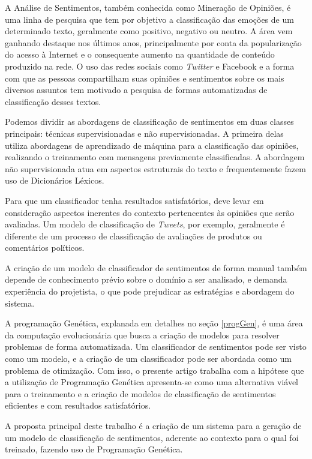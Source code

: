 \documentclass[12pt]{article}
\begin{document}
A Análise de Sentimentos, também conhecida como Mineração de Opiniões, é uma linha de pesquisa que tem por objetivo a classificação das emoções de um determinado texto, geralmente como positivo, negativo ou neutro. A área vem ganhando destaque nos últimos anos, principalmente por conta da popularização do acesso à Internet e o consequente aumento na quantidade de conteúdo produzido na rede. O uso das redes sociais como \emph{Twitter} e Facebook e a forma com que as pessoas compartilham suas opiniões e sentimentos sobre os mais diversos assuntos tem motivado a pesquisa de formas automatizadas de classificação desses textos.

Podemos dividir as abordagens de classificação de sentimentos em duas classes principais: técnicas supervisionadas e não supervisionadas. A primeira delas utiliza abordagens de aprendizado de máquina para a classificação das opiniões, realizando o treinamento com mensagens previamente classificadas. A abordagem não supervisionada atua em aspectos estruturais do texto e frequentemente fazem uso de Dicionários Léxicos.

Para que um classificador tenha resultados satisfatórios, deve levar em consideração aspectos inerentes do contexto pertencentes às opiniões que serão avaliadas. Um modelo de classificação de \emph{Tweets}, por exemplo, geralmente é diferente de um processo de classificação de avaliações de produtos ou comentários políticos.

A criação de um modelo de classificador de sentimentos de forma manual também depende de conhecimento prévio sobre o domínio a ser analisado, e demanda experiência do projetista, o que pode prejudicar as estratégias e abordagem do sistema.


A programação Genética, explanada em detalhes no seção \ref{progGen}, é uma área da computação evolucionária que busca a criação de modelos para resolver problemas de forma automatizada. Um classificador de sentimentos pode ser visto como um modelo, e a criação de um classificador pode ser abordada como um problema de otimização. Com isso, o presente artigo trabalha com a hipótese que a utilização de Programação Genética apresenta-se como uma alternativa viável para o treinamento e a criação de modelos de classificação de sentimentos eficientes e com resultados satisfatórios.

A proposta principal deste trabalho é a criação de um sistema para a geração de um modelo de classificação de sentimentos, aderente ao contexto para o qual foi treinado, fazendo uso de Programação Genética. 
\end{document}
